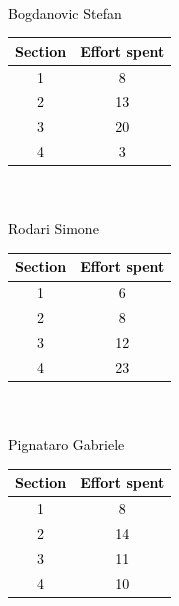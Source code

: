 \textcolor{Black}{
\\
Bogdanovic Stefan\\
\begin{tabular}[h]{|c|c|}
    \hline
    Section & Effort spent \\
    \hline
    1 & 8\\
    \hline
    2 & 13 \\
    \hline
    3 & 20 \\
    \hline
    4 & 3 \\
    \hline
\end{tabular}
\\ \\
Rodari Simone\\
\begin{tabular}[h]{|c|c|}
    \hline
    Section & Effort spent \\
    \hline
    1 & 6 \\
    \hline
    2 & 8 \\
    \hline
    3 & 12 \\
    \hline
    4 & 23 \\
    \hline
\end{tabular}
\\ \\
Pignataro Gabriele\\
\begin{tabular}[h]{|c|c|}
    \hline
    Section & Effort spent \\
    \hline
    1 & 8 \\
    \hline
    2 & 14 \\
    \hline
    3 & 11 \\
    \hline
    4 & 10 \\
    \hline
\end{tabular}
}